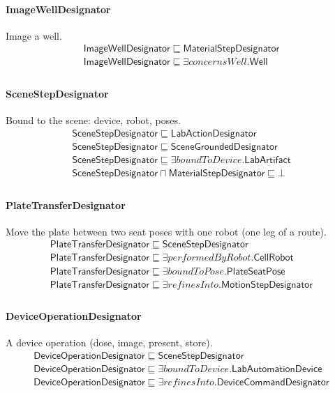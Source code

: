 \documentclass[10pt]{article}
\begin{document}
\paragraph{ImageWellDesignator} Image a well.
\[\begin{array}{l}
\mathsf{ImageWellDesignator} \sqsubseteq  \mathsf{MaterialStepDesignator} \\
\mathsf{ImageWellDesignator} \sqsubseteq  \exists \mathit{concernsWell}.\mathsf{Well} \\
\end{array}\]
\paragraph{SceneStepDesignator} Bound to the scene: device, robot, poses.
\[\begin{array}{l}
\mathsf{SceneStepDesignator} \sqsubseteq  \mathsf{LabActionDesignator} \\
\mathsf{SceneStepDesignator} \sqsubseteq  \mathsf{SceneGroundedDesignator} \\
\mathsf{SceneStepDesignator} \sqsubseteq  \exists \mathit{boundToDevice}.\mathsf{LabArtifact} \\
\mathsf{SceneStepDesignator} \sqcap  \mathsf{MaterialStepDesignator} \sqsubseteq  \bot  \\
\end{array}\]
\paragraph{PlateTransferDesignator} Move the plate between two seat poses with one robot (one leg of a route).
\[\begin{array}{l}
\mathsf{PlateTransferDesignator} \sqsubseteq  \mathsf{SceneStepDesignator} \\
\mathsf{PlateTransferDesignator} \sqsubseteq  \exists \mathit{performedByRobot}.\mathsf{CellRobot} \\
\mathsf{PlateTransferDesignator} \sqsubseteq  \exists \mathit{boundToPose}.\mathsf{PlateSeatPose} \\
\mathsf{PlateTransferDesignator} \sqsubseteq  \exists \mathit{refinesInto}.\mathsf{MotionStepDesignator} \\
\end{array}\]
\paragraph{DeviceOperationDesignator} A device operation (dose, image, present, store).
\[\begin{array}{l}
\mathsf{DeviceOperationDesignator} \sqsubseteq  \mathsf{SceneStepDesignator} \\
\mathsf{DeviceOperationDesignator} \sqsubseteq  \exists \mathit{boundToDevice}.\mathsf{LabAutomationDevice} \\
\mathsf{DeviceOperationDesignator} \sqsubseteq  \exists \mathit{refinesInto}.\mathsf{DeviceCommandDesignator} \\
\end{array}\]
\end{document}
